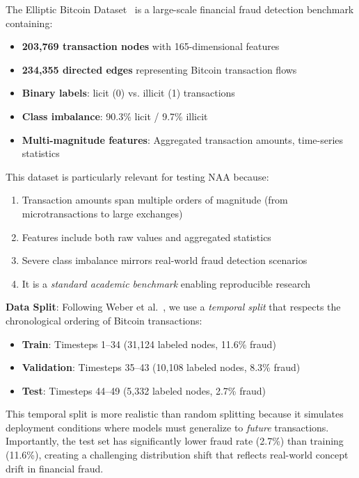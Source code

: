 The Elliptic Bitcoin Dataset~\cite{weber2019anti} is a large-scale financial fraud detection benchmark containing:
\begin{itemize}
\item \textbf{203,769 transaction nodes} with 165-dimensional features
\item \textbf{234,355 directed edges} representing Bitcoin transaction flows
\item \textbf{Binary labels}: licit (0) vs. illicit (1) transactions
\item \textbf{Class imbalance}: 90.3\% licit / 9.7\% illicit
\item \textbf{Multi-magnitude features}: Aggregated transaction amounts, time-series statistics
\end{itemize}

This dataset is particularly relevant for testing NAA because:
\begin{enumerate}
\item Transaction amounts span multiple orders of magnitude (from microtransactions to large exchanges)
\item Features include both raw values and aggregated statistics
\item Severe class imbalance mirrors real-world fraud detection scenarios
\item It is a \textit{standard academic benchmark} enabling reproducible research
\end{enumerate}

\textbf{Data Split}: Following Weber et al.~\cite{weber2019anti}, we use a \textit{temporal split} that respects the chronological ordering of Bitcoin transactions:
\begin{itemize}
\item \textbf{Train}: Timesteps 1--34 (31,124 labeled nodes, 11.6\% fraud)
\item \textbf{Validation}: Timesteps 35--43 (10,108 labeled nodes, 8.3\% fraud)
\item \textbf{Test}: Timesteps 44--49 (5,332 labeled nodes, 2.7\% fraud)
\end{itemize}

This temporal split is more realistic than random splitting because it simulates deployment conditions where models must generalize to \textit{future} transactions. Importantly, the test set has significantly lower fraud rate (2.7\%) than training (11.6\%), creating a challenging distribution shift that reflects real-world concept drift in financial fraud.

